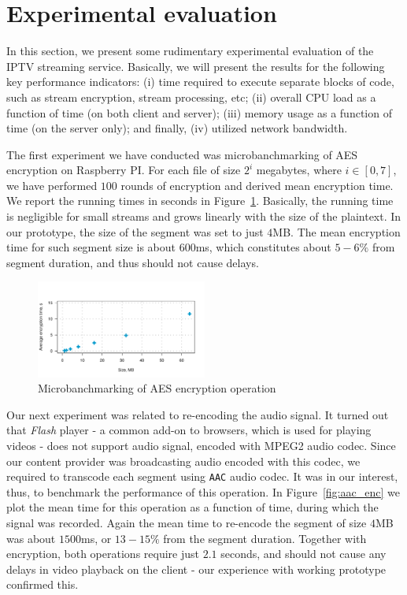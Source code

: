 \section{Experimental evaluation}
\label{section:experiments}

In this section, we present some rudimentary experimental evaluation of the 
IPTV streaming service. Basically, we will present the results for the 
following key performance indicators: (i) time required to execute separate 
blocks of code, such as stream encryption, stream processing, etc; (ii) 
overall CPU load as a function of time (on both client and server); (iii) 
memory usage as a function of time (on the server only); and finally, (iv) utilized network 
bandwidth.

The first experiment we have conducted was microbanchmarking of AES encryption
on Raspberry PI. For each file of size $2^i$ megabytes, where $i \in [0, 7]$,
we have performed $100$ rounds of encryption and derived mean encryption time. We 
report the running times in seconds in Figure~\ref{fig:aes_enc}. Basically,
the running time is negligible for small streams and grows linearly with the size of 
the plaintext. In our prototype, the size of the segment was set to just $4$MB. The mean 
encryption time for such segment size is about $600$ms, which constitutes about $5-6\%$
from segment duration, and thus should not cause delays.

\begin{figure}[!h]
\includegraphics[width=0.5\textwidth]{graphics/microbanchmarking/aes_encryption_duration.pdf}
\caption{Microbanchmarking of AES encryption operation}
\label{fig:aes_enc}
\end{figure}

Our next experiment was related to re-encoding the audio signal. It turned out that
\textit{Flash} player - a common add-on to browsers, which is used for playing videos - does 
not support audio signal, encoded with MPEG2 audio codec. Since our content 
provider was broadcasting audio encoded with this codec, we required to transcode 
each segment using \texttt{AAC} audio codec. It was in our interest, thus, to 
benchmark the performance of this operation. In Figure~\ref{fig:aac_enc} we plot 
the mean time for this operation as a function of time, during which the signal 
was recorded. Again the mean time to re-encode the segment of size $4$MB was about
$1500$ms, or $13-15\%$ from the segment duration. Together with encryption, both operations
require just $2.1$ seconds, and should not cause any delays in video playback on the 
client - our experience with working prototype confirmed this. 

